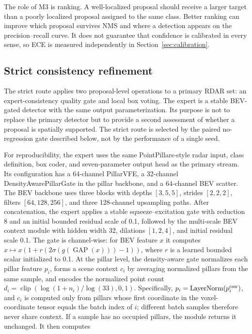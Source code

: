 \documentclass[preprint,12pt,times]{elsarticle}
\begin{document}
The role of M3 is ranking. A well-localized proposal should receive a larger
target than a poorly localized proposal assigned to the same class. Better
ranking can improve which proposal survives NMS and where a detection appears
on the precision--recall curve. It does not guarantee that confidence is
calibrated in every sense, so ECE is measured independently in
Section~\ref{sec:calibration}.

\subsection{Strict consistency refinement}

The strict route applies two proposal-level operations to a primary RDAR set:
an expert-consistency quality gate and local box voting. The expert is a
stable BEV-gated detector with the same output parameterization. Its purpose is
not to replace the primary detector but to provide a second assessment of
whether a proposal is spatially supported. The strict route is selected by the
paired no-regression gate described below, not by the performance of a single
seed.

For reproducibility, the expert uses the same PointPillars-style radar input,
class definition, box coder, and seven-parameter output head as the primary
stream. Its configuration has a 64-channel PillarVFE, a 32-channel
DensityAwarePillarGate in the pillar backbone, and a 64-channel BEV scatter.
The BEV backbone uses three blocks with depths $[3,5,5]$, strides
$[2,2,2]$, filters $[64,128,256]$, and three 128-channel upsampling paths.
After concatenation, the expert applies a stable squeeze--excitation gate with
reduction 8 and an initial bounded residual scale of 0.1, followed by the
multi-scale BEV context module with hidden width 32, dilations $[1,2,4]$, and
initial residual scale 0.1. The gate is channel-wise: for BEV feature $x$ it
computes $x\mapsto x(1+r(2\sigma(g(\operatorname{GAP}(x)))-1))$, where $r$ is
a learned bounded scalar initialized to 0.1. At the pillar level, the density-aware gate
normalizes each pillar feature $p_i$, forms a scene context $c_i$ by averaging
normalized pillars from the same sample, and encodes the normalized point
count $d_i=\operatorname{clip}(\log(1+n_i)/\log(33),0,1)$. Specifically,
$p_i=\operatorname{LayerNorm}(p_i^{\rm raw})$, and $c_i$ is computed only
from pillars whose first coordinate in the voxel-coordinate tensor equals the
batch index of $i$; different batch samples therefore never share context.
If a sample has no occupied pillars, the module returns it unchanged. It then computes
\end{document}
